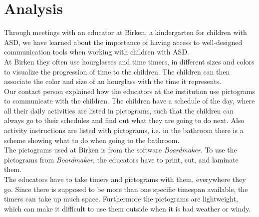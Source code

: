 \chapter{Analysis}
\label{cha:analysis}
Through meetings with an educator at Birken, a kindergarten for children with ASD, we have learned about the importance of having access to well-designed communication tools when working with children with ASD.\\

At Birken they often use hourglasses and time timers, in different sizes and colors to visualize the progression of time to the children. The children can then associate the color and size of an hourglass with the time it represents.\\
Our contact person explained how the educators at the institution use pictograms to communicate with the children. The children have a schedule of the day, where all their daily activities are listed in pictograms, such that the children can always go to their schedules and find out what they are going to do next. Also activity instructions are listed with pictograms, i.e. in the bathroom there is a scheme showing what to do when going to the bathroom.\\
The pictograms used at Birken is from the software \textit{Boardmaker}\cite{web:boardmaker}. To use the pictograms from \textit{Boardmaker}, the educators have to print, cut, and laminate them.\\

The educators have to take timers and pictograms with them, everywhere they go. Since there is supposed to be more than one specific timespan available, the timers can take up much space. Furthermore the pictograms are lightweight, which can make it difficult to use them outside when it is bad weather or windy.